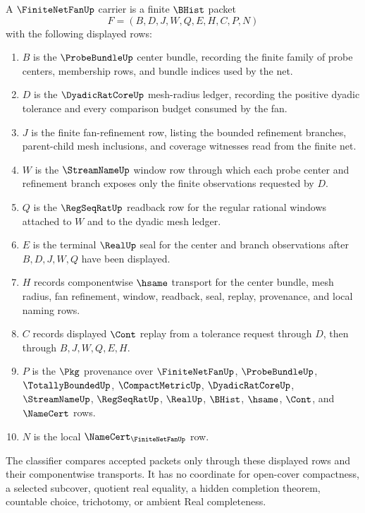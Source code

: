 \begin{definition}
\label{def:finite-net-fan-carrier}
A $\FiniteNetFanUp$ carrier is a finite $\BHist$ packet
$$
F=(B,D,J,W,Q,E,H,C,P,N)
$$
with the following displayed rows:
\begin{enumerate}
\item $B$ is the $\ProbeBundleUp$ center bundle, recording the finite family of probe centers, membership rows, and bundle indices used by the net.
\item $D$ is the $\DyadicRatCoreUp$ mesh-radius ledger, recording the positive dyadic tolerance and every comparison budget consumed by the fan.
\item $J$ is the finite fan-refinement row, listing the bounded refinement branches, parent-child mesh inclusions, and coverage witnesses read from the finite net.
\item $W$ is the $\StreamNameUp$ window row through which each probe center and refinement branch exposes only the finite observations requested by $D$.
\item $Q$ is the $\RegSeqRatUp$ readback row for the regular rational windows attached to $W$ and to the dyadic mesh ledger.
\item $E$ is the terminal $\RealUp$ seal for the center and branch observations after $B,D,J,W,Q$ have been displayed.
\item $H$ records componentwise $\hsame$ transport for the center bundle, mesh radius, fan refinement, window, readback, seal, replay, provenance, and local naming rows.
\item $C$ records displayed $\Cont$ replay from a tolerance request through $D$, then through $B,J,W,Q,E,H$.
\item $P$ is the $\Pkg$ provenance over $\FiniteNetFanUp$, $\ProbeBundleUp$, $\TotallyBoundedUp$, $\CompactMetricUp$, $\DyadicRatCoreUp$, $\StreamNameUp$, $\RegSeqRatUp$, $\RealUp$, $\BHist$, $\hsame$, $\Cont$, and $\NameCert$ rows.
\item $N$ is the local $\NameCert_{\FiniteNetFanUp}$ row.
\end{enumerate}
The classifier compares accepted packets only through these displayed rows and their componentwise transports. It has no coordinate for open-cover compactness, a selected subcover, quotient real equality, a hidden completion theorem, countable choice, trichotomy, or ambient Real completeness.
\end{definition}

